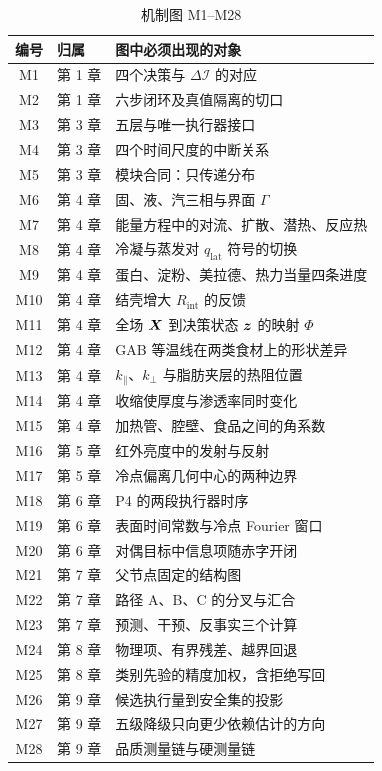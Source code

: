 \begin{table}[H]
\centering
\caption{机制图 M1--M28}
\begin{tabularx}{\textwidth}{clX}
\toprule
编号 & 归属 & 图中必须出现的对象 \\
\midrule
M1 & 第 1 章 & 四个决策与 $\Delta\mathcal{I}$ 的对应 \\
M2 & 第 1 章 & 六步闭环及真值隔离的切口 \\
M3 & 第 3 章 & 五层与唯一执行器接口 \\
M4 & 第 3 章 & 四个时间尺度的中断关系 \\
M5 & 第 3 章 & 模块合同：只传递分布 \\
M6 & 第 4 章 & 固、液、汽三相与界面 $\Gamma$ \\
M7 & 第 4 章 & 能量方程中的对流、扩散、潜热、反应热 \\
M8 & 第 4 章 & 冷凝与蒸发对 $q_{\mathrm{lat}}$ 符号的切换 \\
M9 & 第 4 章 & 蛋白、淀粉、美拉德、热力当量四条进度 \\
M10 & 第 4 章 & 结壳增大 $R_{\mathrm{int}}$ 的反馈 \\
M11 & 第 4 章 & 全场 $\bm{X}$ 到决策状态 $\bm{z}$ 的映射 $\Phi$ \\
M12 & 第 4 章 & GAB 等温线在两类食材上的形状差异 \\
M13 & 第 4 章 & $k_\parallel$、$k_\perp$ 与脂肪夹层的热阻位置 \\
M14 & 第 4 章 & 收缩使厚度与渗透率同时变化 \\
M15 & 第 4 章 & 加热管、腔壁、食品之间的角系数 \\
M16 & 第 5 章 & 红外亮度中的发射与反射 \\
M17 & 第 5 章 & 冷点偏离几何中心的两种边界 \\
M18 & 第 6 章 & P4 的两段执行器时序 \\
M19 & 第 6 章 & 表面时间常数与冷点 Fourier 窗口 \\
M20 & 第 6 章 & 对偶目标中信息项随赤字开闭 \\
M21 & 第 7 章 & 父节点固定的结构图 \\
M22 & 第 7 章 & 路径 A、B、C 的分叉与汇合 \\
M23 & 第 7 章 & 预测、干预、反事实三个计算 \\
M24 & 第 8 章 & 物理项、有界残差、越界回退 \\
M25 & 第 8 章 & 类别先验的精度加权，含拒绝写回 \\
M26 & 第 9 章 & 候选执行量到安全集的投影 \\
M27 & 第 9 章 & 五级降级只向更少依赖估计的方向 \\
M28 & 第 9 章 & 品质测量链与硬测量链 \\
\bottomrule
\end{tabularx}
\end{table}

